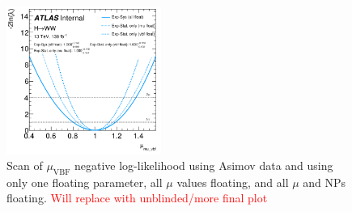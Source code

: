 \begin{figure}[!h]
\centering
\includegraphics[width=0.45\textwidth]{Pictures/fitresults/afterfit.png}
\caption{Scan of $\mu_{\text{VBF}}$ negative log-likelihood using Asimov data and using only one floating parameter, all $\mu$ values floating, and all $\mu$ and NPs floating. \textcolor{red}{Will replace with unblinded/more final plot}}
\label{fig:scan}
\end{figure}

